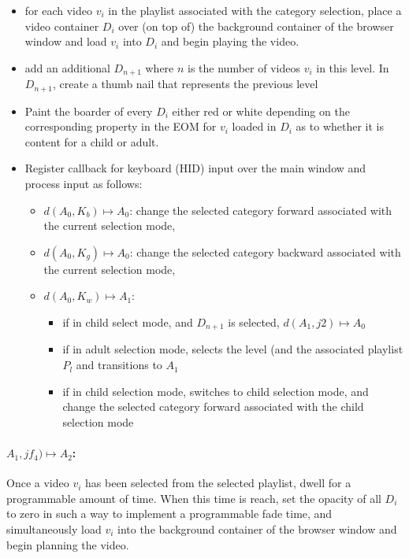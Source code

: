 \documentclass[10pt]{article}
\begin{document}
\begin{itemize}
	\item for each video $v_{i}$ in the playlist associated with the category selection, place a video container $D_{i}$ over (on top of) the background container of the browser window and load $v_{i}$ into $D_{i}$ and begin playing the video.
	\item add an additional $D_{n+1}$ where $n$ is the number of videos $v_{i}$ in this level. In $D_{n+1}$, create a thumb nail that represents the previous level
	\item Paint the boarder of every $D_{i}$ either red or white depending on the corresponding property in the EOM for $v_{i}$ loaded in $D_{i}$ as to whether it is content for a child or adult.
	\item Register callback for keyboard (HID) input over the main window and process input as follows:
	\begin{itemize}
		\item $d(A_{0}, K_{b}) \mapsto A_{0}$: change the selected category forward associated with the current selection mode,
		\item $d(A_{0}, K_{g}) \mapsto A_{0}$: change the selected category backward associated with the current selection mode,
		\item $d(A_{0}, K_{w}) \mapsto A_{1}$: 
		\begin{itemize}
			\item if in child select mode, and $D_{n+1}$ is selected, $d(A_{1}, j{2}) \mapsto A_{0}$
			\item if in adult selection mode, selects the level (and the associated playlist $P_{l}$ and transitions to $A_{1}$
			\item if in child selection mode, switches to child selection mode, and change the selected category forward associated with the child selection mode
		\end{itemize}
	\end{itemize}
\end{itemize}

\paragraph{$A_{1},jf_{4}) \mapsto A_{2}$:}

Once a video $v_{i}$ has been selected from the selected playlist, dwell for a programmable amount of time. When this time is reach, set the opacity of all $D_{i}$ to zero in such a way to implement a programmable fade time, and simultaneously load $v_{i}$ into the background container of the browser window and begin planning the video. 
\end{document}
